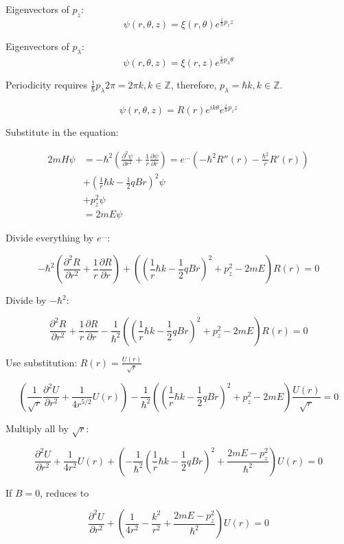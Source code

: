 \documentclass[12pt, a4paper]{article}
\begin{document}
Eigenvectors of $p_z$:
$$\psi(r, \theta, z) = \xi(r, \theta) e^{\frac{i}{\hbar} p_z z}$$

Eigenvectors of $p_\lambda$:
$$\psi(r, \theta, z) = \xi(r, z) e^{\frac{i}{\hbar} p_\lambda \theta}$$

Periodicity requires $\frac{1}{\hbar} p_\lambda 2 \pi = 2 \pi k, k \in \mathbb{Z}$, therefore, $p_\lambda = \hbar k, k \in \mathbb{Z}$.

$$\psi(r, \theta, z) = R(r) e^{i k \theta} e^{\frac{i}{\hbar} p_z z}$$

Substitute in the equation:

\begin{align*}
2 m H \psi
&= -\hbar^2 \left( \frac{\partial^2 \psi}{\partial r^2} + \frac{1}{r} \frac{\partial \psi}{\partial r} \right) =
e^{...} (-\hbar^2 R''(r) -\frac{\hbar^2}{r} R'(r)) \\
&+ (\frac{1}{r} \hbar k - \frac{1}{2} q B r)^2 \psi \\
&+ p_z^2  \psi \\
&= 2 m E \psi
\end{align*}

Divide everything by $e^{...}$:

$$- \hbar^2 \left( \frac{\partial^2 R}{\partial r^2} + \frac{1}{r} \frac{\partial R}{\partial r} \right)
+ \left(
(\frac{1}{r} \hbar k - \frac{1}{2} q B r)^2
+ p^2_z
- 2 m E
\right)
R(r) = 0$$

Divide by $-\hbar^2$:

$$\frac{\partial^2 R}{\partial r^2} + \frac{1}{r} \frac{\partial R}{\partial r}
- \frac{1}{\hbar^2}
\left(
(\frac{1}{r} \hbar k - \frac{1}{2} q B r)^2
+ p^2_z
- 2 m E
\right)
R(r) = 0$$

Use substitution: $R(r) = \frac{U(r)}{\sqrt{r}}$

$$\left(
\frac{1}{\sqrt r} \frac{\partial^2 U}{\partial r^2}
+ \frac{1}{4 r^{5/2}} U(r) \right)
- \frac{1}{\hbar^2}
\left(
(\frac{1}{r} \hbar k - \frac{1}{2} q B r)^2
+ p^2_z
- 2 m E
\right)
\frac{U(r)}{\sqrt{r}} = 0$$

Multiply all by $\sqrt{r}$:

$$\frac{\partial^2 U}{\partial r^2}
+ \frac{1}{4 r^2} U(r)
+ \left(
- \frac{1}{\hbar^2} (\frac{1}{r} \hbar k - \frac{1}{2} q B r)^2
+ \frac{2 m E - p_z^2}{\hbar^2}
\right)
U(r) = 0$$


If $B = 0$, reduces to 

$$\frac{\partial^2 U}{\partial r^2}
+ \left(
\frac{1}{4 r^2}
- \frac{k^2}{r^2}
+ \frac{2 m E - p_z^2}{\hbar^2}
\right)
U(r) = 0$$
\end{document}
